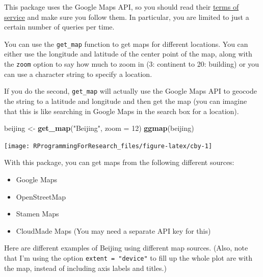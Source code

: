 \documentclass[]{book}
\makeatletter
\newenvironment{Shaded}{\begin{snugshade}}{\end{snugshade}}
\newcommand{\KeywordTok}[1]{\textcolor[rgb]{0.13,0.29,0.53}{\textbf{#1}}}
\newcommand{\DataTypeTok}[1]{\textcolor[rgb]{0.13,0.29,0.53}{#1}}
\newcommand{\DecValTok}[1]{\textcolor[rgb]{0.00,0.00,0.81}{#1}}
\newcommand{\StringTok}[1]{\textcolor[rgb]{0.31,0.60,0.02}{#1}}
\newcommand{\NormalTok}[1]{#1}
\providecommand{\tightlist}{%
  \setlength{\itemsep}{0pt}\setlength{\parskip}{0pt}}
\newenvironment{kframe}{%
\medskip{}
\setlength{\fboxsep}{.8em}
 \def\at@end@of@kframe{}%
 \ifinner\ifhmode%
  \def\at@end@of@kframe{\end{minipage}}%
  \begin{minipage}{\columnwidth}%
 \fi\fi%
 \def\FrameCommand##1{\hskip\@totalleftmargin \hskip-\fboxsep
 \colorbox{shadecolor}{##1}\hskip-\fboxsep
     \hskip-\linewidth \hskip-\@totalleftmargin \hskip\columnwidth}%
 \MakeFramed {\advance\hsize-\width
   \@totalleftmargin\z@ \linewidth\hsize
   \@setminipage}}%
 {\par\unskip\endMakeFramed%
 \at@end@of@kframe}
\renewenvironment{Shaded}{\begin{kframe}}{\end{kframe}}
\theoremstyle{definition}
\theoremstyle{definition}
\theoremstyle{definition}
\theoremstyle{remark}
\makeatother
\begin{document}
This package uses the Google Maps API, so you should read their
\href{http://developers.google.com/maps/terms}{terms of service} and
make sure you follow them. In particular, you are limited to just a
certain number of queries per time.

You can use the \texttt{get\_map} function to get maps for different
locations. You can either use the longitude and latitude of the center
point of the map, along with the \texttt{zoom} option to say how much to
zoom in (3: continent to 20: building) or you can use a character string
to specify a location.

If you do the second, \texttt{get\_map} will actually use the Google
Maps API to geocode the string to a latitude and longitude and then get
the map (you can imagine that this is like searching in Google Maps in
the search box for a location).

\begin{Shaded}
\begin{Highlighting}[]
\NormalTok{beijing <-}\StringTok{ }\KeywordTok{get_map}\NormalTok{(}\StringTok{"Beijing"}\NormalTok{, }\DataTypeTok{zoom =} \DecValTok{12}\NormalTok{)}
\KeywordTok{ggmap}\NormalTok{(beijing)}
\end{Highlighting}
\end{Shaded}

\begin{center}\texttt{[image: RProgrammingForResearch\_files/figure-latex/cby-1]} \end{center}

With this package, you can get maps from the following different
sources:

\begin{itemize}
\tightlist
\item
  Google Maps
\item
  OpenStreetMap
\item
  Stamen Maps
\item
  CloudMade Maps (You may need a separate API key for this)
\end{itemize}

Here are different examples of Beijing using different map sources.
(Also, note that I'm using the option \texttt{extent\ =\ "device"} to
fill up the whole plot are with the map, instead of including axis
labels and titles.)
\end{document}
